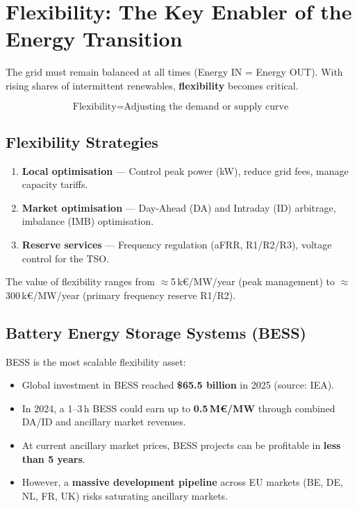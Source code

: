 \section{Flexibility: The Key Enabler of the Energy Transition}

The grid must remain balanced at all times (Energy IN = Energy OUT). With rising shares of intermittent renewables, \textbf{flexibility} becomes critical.

\[
\text{Flexibility} = \text{Adjusting the demand or supply curve}
\]

\subsection*{Flexibility Strategies}

\begin{enumerate}[noitemsep]
    \item \textbf{Local optimisation} — Control peak power (kW), reduce grid fees, manage capacity tariffs.
    \item \textbf{Market optimisation} — Day-Ahead (DA) and Intraday (ID) arbitrage, imbalance (IMB) optimisation.
    \item \textbf{Reserve services} — Frequency regulation (aFRR, R1/R2/R3), voltage control for the TSO.
\end{enumerate}

\noindent The value of flexibility ranges from $\approx$5\,k€/MW/year (peak management) to $\approx$300\,k€/MW/year (primary frequency reserve R1/R2).

\subsection*{Battery Energy Storage Systems (BESS)}

BESS is the most scalable flexibility asset:
\begin{itemize}[noitemsep]
    \item Global investment in BESS reached \textbf{\$65.5 billion} in 2025 (source: IEA).
    \item In 2024, a 1–3\,h BESS could earn up to \textbf{0.5\,M€/MW} through combined DA/ID and ancillary market revenues.
    \item At current ancillary market prices, BESS projects can be profitable in \textbf{less than 5 years}.
    \item However, a \textbf{massive development pipeline} across EU markets (BE, DE, NL, FR, UK) risks saturating ancillary markets.
\end{itemize}

